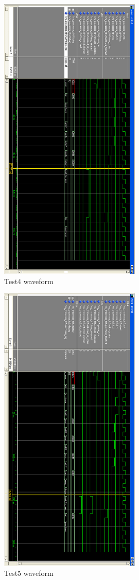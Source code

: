 \begin{figure}
\centering
\includegraphics[width=0.6\textwidth]{img/wavetest4.png}
\caption{Test4 waveform}
\label{fig:test4}
\end{figure}

\begin{figure}
\centering
\includegraphics[width=0.6\textwidth]{img/wavetest5.png}
\caption{Test5 waveform}
\label{fig:test}
\end{figure}
